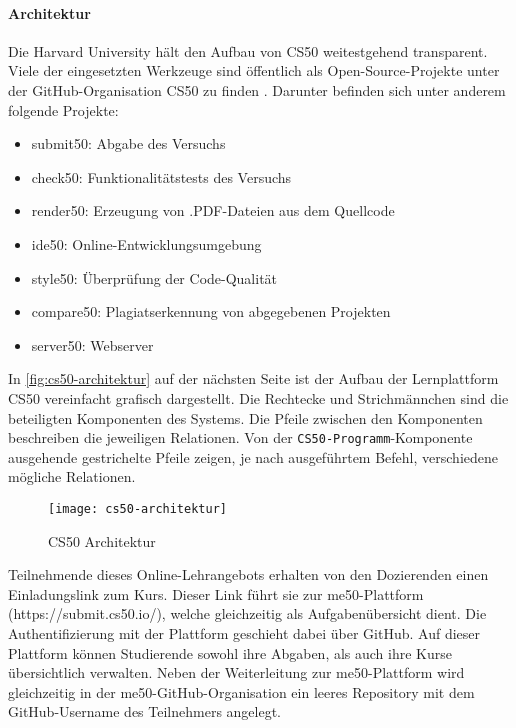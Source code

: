 \newpage

\paragraph{Architektur}
Die Harvard University hält den Aufbau von CS50 weitestgehend transparent.
Viele der eingesetzten Werkzeuge sind öffentlich als Open-Source-Projekte unter
der GitHub-Organisation \glqq CS50\grqq{} zu finden \parencite{cs50-github}.
Darunter befinden sich unter anderem folgende Projekte:
\begin{itemize}
\item submit50: Abgabe des Versuchs
\item check50: Funktionalitätstests des Versuchs
\item render50: Erzeugung von .PDF-Dateien aus dem Quellcode
\item ide50: Online-Entwicklungsumgebung
\item style50: Überprüfung der Code-Qualität
\item compare50: Plagiatserkennung von abgegebenen Projekten
\item server50: Webserver
\end{itemize}

In \autoref{fig:cs50-architektur} auf der nächsten Seite ist der Aufbau der
Lernplattform CS50 vereinfacht grafisch dargestellt. Die Rechtecke und
Strichmännchen sind die beteiligten Komponenten des Systems. Die Pfeile zwischen
den Komponenten beschreiben die jeweiligen Relationen. Von der
\texttt{CS50-Programm}-Komponente ausgehende gestrichelte Pfeile zeigen, je nach 
ausgeführtem Befehl, verschiedene mögliche Relationen.

\begin{figure}[h]
    \centering
    \texttt{[image: cs50-architektur]}
    \caption{CS50 Architektur}
    \label{fig:cs50-architektur}
\end{figure}

Teilnehmende dieses Online-Lehrangebots erhalten von den Dozierenden einen
Einladungslink zum Kurs. Dieser Link führt sie zur me50-Plattform
(https://submit.cs50.io/), welche gleichzeitig als Aufgabenübersicht dient. Die
Authentifizierung mit der Plattform geschieht dabei über GitHub. Auf dieser
Plattform können Studierende sowohl ihre Abgaben, als auch ihre Kurse
übersichtlich verwalten. Neben der Weiterleitung zur me50-Plattform wird
gleichzeitig in der me50-GitHub-Organisation ein leeres Repository mit dem
GitHub-Username des Teilnehmers angelegt.

